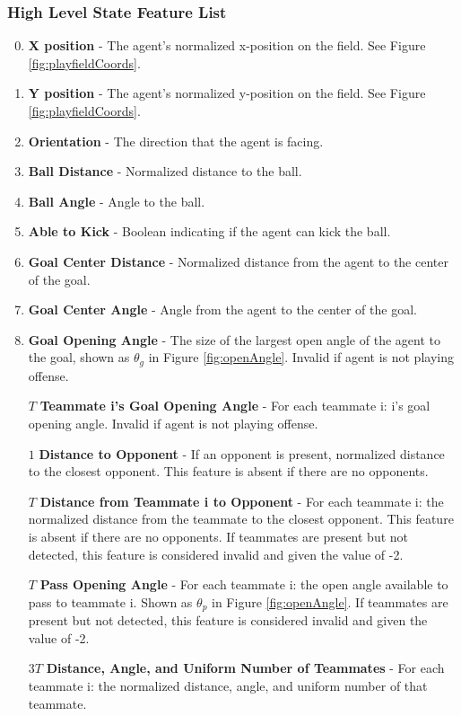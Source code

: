 \documentclass[12pt]{article}
\begin{document}
\subsubsection{High Level State Feature List}
\begin{enumerate}
\setcounter{enumi}{-1}
\item{\textbf{X position} - The agent’s normalized x-position on the
  field. See Figure \ref{fig:playfieldCoords}.}
\item{\textbf{Y position} - The agent’s normalized y-position on the
  field. See Figure \ref{fig:playfieldCoords}.}
\item{\textbf{Orientation} - The direction that the agent is facing.}
\item{\textbf{Ball Distance} - Normalized distance to the ball.}
\item{\textbf{Ball Angle} - Angle to the ball.}
\item{\textbf{Able to Kick} - Boolean indicating if the agent can kick the ball.}
\item{\textbf{Goal Center Distance} - Normalized distance from the agent to the center of the goal.}
\item{\textbf{Goal Center Angle} - Angle from the agent to the center of the goal.}
\item{\textbf{Goal Opening Angle} - The size of the largest open angle
  of the agent to the goal, shown as $\theta_g$ in Figure
  \ref{fig:openAngle}. Invalid if agent is not playing offense.}
\item [$T$] {\textbf{Teammate i's Goal Opening Angle} - For each
  teammate i: i’s goal opening angle. Invalid if agent is not playing
  offense.}
\item [$1$] {\textbf{Distance to Opponent} - If an opponent is
  present, normalized distance to the closest opponent. This feature
  is absent if there are no opponents.}
\item [$T$] {\textbf{Distance from Teammate i to Opponent} - For each
  teammate i: the normalized distance from the teammate to the closest
  opponent. This feature is absent if there are no opponents. If
  teammates are present but not detected, this feature is considered
  invalid and given the value of -2.}
\item [$T$] {\textbf{Pass Opening Angle} - For each teammate i: the open
  angle available to pass to teammate i. Shown as $\theta_p$ in Figure
  \ref{fig:openAngle}. If teammates are present but not detected, this
  feature is considered invalid and given the value of -2.}
\item [$3T$] {\textbf{Distance, Angle, and Uniform Number of
    Teammates} - For each teammate i: the normalized distance, angle,
  and uniform number of that teammate.}
\end{enumerate}
\end{document}
